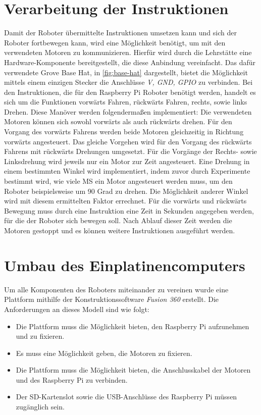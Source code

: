 \inputminted{python}{{assets/code/json-check.py}}
\vspace*{-3mm}
\vspace*{3mm}

\section{Verarbeitung der Instruktionen}
Damit der Roboter übermittelte Instruktionen umsetzen kann und sich der Roboter fortbewegen kann, wird eine Möglichkeit benötigt, um mit den verwendeten Motoren zu kommunizieren. Hierfür wird durch die Lehrstätte eine Hardware-Komponente bereitgestellt, die diese Anbindung vereinfacht. Das dafür verwendete Grove Base Hat, in \autoref{fig:base-hat} dargestellt, bietet die Möglichkeit mittels einem einzigen Stecker die Anschlüsse \textit{V, GND, GPIO} zu verbinden. Bei den Instruktionen, die für den Raspberry Pi Roboter benötigt werden, handelt es sich um die Funktionen vorwärts Fahren, rückwärts Fahren, rechts, sowie links Drehen. Diese Manöver werden folgendermaßen implementiert: Die verwendeten Motoren können sich sowohl vorwärts als auch rückwärts drehen. Für den Vorgang des vorwärts Fahrens werden beide Motoren gleichzeitig in Richtung vorwärts angesteuert. Das gleiche Vorgehen wird für den Vorgang des rückwärts Fahrens mit rückwärts Drehungen umgesetzt. Für die Vorgänge der Rechts- sowie Linksdrehung wird jeweils nur ein Motor zur Zeit angesteuert. Eine Drehung in einem bestimmten Winkel wird implementiert, indem zuvor durch Experimente bestimmt wird, wie viele MS ein Motor angesteuert werden muss, um den Roboter beispielsweise um 90 Grad zu drehen. Die Möglichkeit anderer Winkel wird mit diesem ermittelten Faktor errechnet. Für die vorwärts und rückwärts Bewegung muss durch eine Instruktion eine Zeit in Sekunden angegeben werden, für die der Roboter sich bewegen soll. Nach Ablauf dieser Zeit werden die Motoren gestoppt und es können weitere Instruktionen ausgeführt werden.

\section{Umbau des Einplatinencomputers}
Um alle Komponenten des Roboters miteinander zu vereinen wurde eine Plattform mithilfe der Konstruktionssoftware \textit{Fusion 360} erstellt. Die Anforderungen an dieses Modell sind wie folgt:
\begin{itemize}
  \item Die Plattform muss die Möglichkeit bieten, den Raspberry Pi aufzunehmen und zu fixieren.
  \item Es muss eine Möglichkeit geben, die Motoren zu fixieren.
  \item Die Plattform muss die Möglichkeit bieten, die Anschlusskabel der Motoren und des Raspberry Pi zu verbinden.
  \item Der SD-Kartenslot sowie die USB-Anschlüsse des Raspberry Pi müssen zugänglich sein.
\end{itemize}

